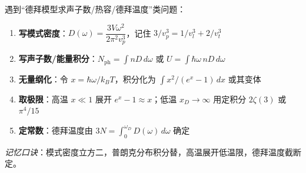 \begin{thinkbox}
遇到``德拜模型求声子数/热容/德拜温度''类问题：
\begin{enumerate}
    \item \textbf{写模式密度}：$D(\omega)=\dfrac{3V\omega^2}{2\pi^2v_p^3}$，记住 $3/v_p^3=1/v_l^3+2/v_t^3$
    \item \textbf{写声子数/能量积分}：$N_{\text{ph}}=\int nD\,d\omega$ 或 $U=\int\hbar\omega\,nD\,d\omega$
    \item \textbf{无量纲化}：令 $x=\hbar\omega/k_BT$，积分化为 $\int x^2/(e^x-1)\,dx$ 或其变体
    \item \textbf{取极限}：高温 $x\ll1$ 展开 $e^x-1\approx x$；低温 $x_D\to\infty$ 用定积分 $2\zeta(3)$ 或 $\pi^4/15$
    \item \textbf{定常数}：德拜温度由 $3N=\int_0^{\omega_D}D(\omega)\,d\omega$ 确定
\end{enumerate}
\textit{记忆口诀}：模式密度立方二，普朗克分布积分替，高温展开低温限，德拜温度截断定。
\end{thinkbox}
